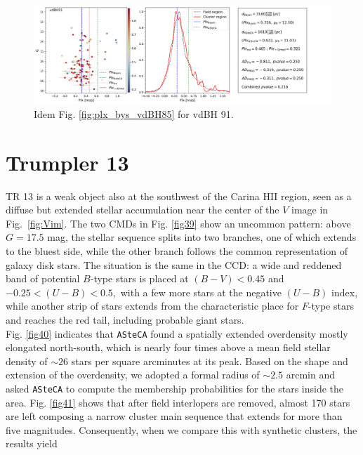 \documentclass[draft]{aa}
\begin{document}
\begin{figure}[ht]
    \centering
    \includegraphics[width=\hsize]{../figs/plx_vdBH91.png}
    \caption{Idem Fig. \ref{fig:plx_bys_vdBH85} for vdBH 91.}
    \label{fig30}
\end{figure}



\section{Trumpler 13}

TR 13 is a weak object also at the southwest of the Carina HII
region, seen as a diffuse but extended stellar accumulation near the center of the
$V$ image in Fig.~\ref{fig:Vim}. The two CMDs in Fig. \ref{fig39} show an
uncommon pattern:  above $G=17.5$ mag, the stellar sequence splits
into two branches, one of which extends to the bluest side, while the other
branch follows the common representation of galaxy disk stars. The situation is the same in the CCD: a wide and reddened band of potential
$B$-type stars is placed at $(B-V)<0.45$ and $-0.25<(U-B)<0.5,$ with a few
more stars at  the negative $(U-B)$ index, while another strip of stars extends from the
characteristic place for $F$-type stars and reaches the red tail, including
probable giant stars.\\

Fig. \ref{fig40} indicates that \texttt{ASteCA} found a spatially extended
overdensity mostly elongated north-south, which is nearly four times
above a mean field stellar density of $\sim26$ stars per square arcminutes at
its peak. Based on the shape and extension of the overdensity, we adopted a
formal radius of $\sim2.5$ arcmin and asked \texttt{ASteCA} to compute the
membership probabilities for the stars inside the area. 
Fig. \ref{fig41} shows that after field interlopers are removed, almost 170
stars are left composing a narrow cluster main sequence that extends for more than
five magnitudes. Consequently, when we compare this with synthetic clusters,
the results yield
\end{document}
